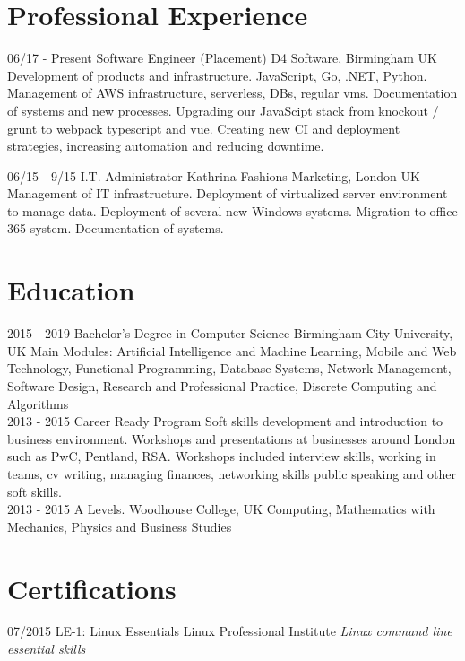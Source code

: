 \documentclass[]{friggeri-cv}
\begin{document}
\section{Professional Experience}
\begin{entrylist}
  \entry
    {06/17 - Present}
    {Software Engineer (Placement) }
    {D4 Software, Birmingham UK}
    {Development of products and infrastructure.
JavaScript, Go, .NET, Python.
Management of AWS infrastructure, serverless, DBs, regular vms.
Documentation of systems and new processes. Upgrading our
JavaScipt stack from knockout / grunt to webpack typescript and vue. Creating new CI and deployment strategies, increasing automation and reducing downtime.\\}

  \entry
    {06/15 - 9/15}
    {I.T. Administrator}
    {Kathrina Fashions Marketing, London UK}
    {Management of IT infrastructure.
Deployment of virtualized server environment to manage data.
Deployment of several new Windows systems.
Migration to office 365 system.
Documentation of systems.\\}

\end{entrylist}

\section{Education}
\begin{entrylist}
  \entry
    {2015 - 2019}
    {Bachelor's Degree in Computer Science}
    {Birmingham City University, UK}
    {Main Modules: Artificial Intelligence and Machine Learning, Mobile and Web Technology, Functional Programming, Database Systems, Network Management, Software Design, Research and Professional Practice, Discrete Computing and Algorithms\\}
  \entry
    {2013 - 2015}
    {Career Ready Program}
    {}
    {Soft skills development and introduction to business environment.
Workshops and presentations at businesses around London such as PwC, Pentland, RSA.
Workshops included interview skills, working in teams, cv writing, managing finances, networking skills public speaking and other soft skills.\\}
  \entry
    {2013 - 2015}
    {A Levels.}
    {Woodhouse College, UK}
    {Computing, Mathematics with Mechanics, Physics and Business Studies}
\end{entrylist}

\section{Certifications}
\begin{entrylist}
  \entry
    {07/2015}
    {LE-1: Linux Essentials}
    {Linux Professional Institute}
    {\emph{Linux command line essential skills}}
\end{entrylist}
\end{document}
